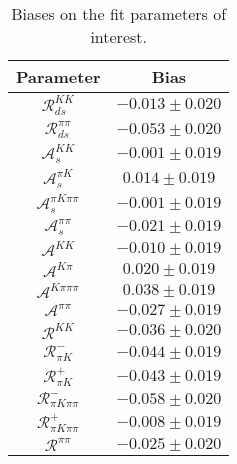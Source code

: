 \begin{table}
  \centering
  \small
  \begin{tabular}{cc}
  \toprule
      Parameter & Bias \\
  \midrule
      $\mathcal{R}_{ds}^{KK}$ & $-0.013 \pm 0.020$ \\
      $\mathcal{R}_{ds}^{\pi\pi}$ & $-0.053 \pm 0.020$ \\
      $\mathcal{A}_s^{KK}$ & $-0.001 \pm 0.019$ \\
      $\mathcal{A}_s^{\pi K}$ & $0.014 \pm 0.019$ \\
      $\mathcal{A}_s^{\pi K\pi\pi}$ & $-0.001 \pm 0.019$ \\
      $\mathcal{A}_s^{\pi\pi}$ & $-0.021 \pm 0.019$ \\
      $\mathcal{A}^{KK}$ & $-0.010 \pm 0.019$ \\
      $\mathcal{A}^{K\pi}$ & $0.020 \pm 0.019$ \\
      $\mathcal{A}^{K\pi\pi\pi}$ & $0.038 \pm 0.019$ \\
      $\mathcal{A}^{\pi\pi}$ & $-0.027 \pm 0.019$ \\
      $\mathcal{R}^{KK}$ & $-0.036 \pm 0.020$ \\
      $\mathcal{R}_{\pi K}^-$ & $-0.044 \pm 0.019$ \\
      $\mathcal{R}_{\pi K}^+$ & $-0.043 \pm 0.019$ \\
      $\mathcal{R}_{\pi K\pi\pi}^-$ & $-0.058 \pm 0.020$ \\
      $\mathcal{R}_{\pi K\pi\pi}^+$ & $-0.008 \pm 0.019$ \\
      $\mathcal{R}^{\pi\pi}$ & $-0.025 \pm 0.020$ \\
      \bottomrule
  \end{tabular}
  \caption{Biases on the fit parameters of interest.}
\label{tab:biases_combinedRuns}
\end{table}
